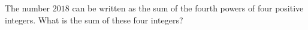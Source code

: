 The number $2018$ can be written as the sum of the fourth powers of four positive integers. What is the sum of these four integers?
